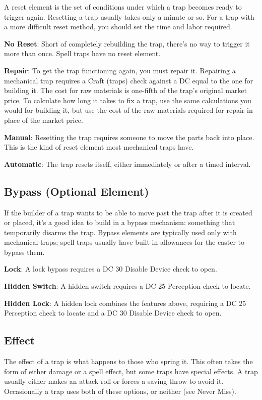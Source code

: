 				
A reset element is the set of conditions under which a trap becomes ready to trigger again. Resetting a trap usually takes only a minute or so. For a trap with a more difficult reset method, you should set the time and labor required.
				
\textbf{No Reset}: Short of completely rebuilding the trap, there's no way to trigger it more than once. Spell traps have no reset element. 
				
\textbf{Repair}: To get the trap functioning again, you must repair it. Repairing a mechanical trap requires a Craft (traps) check against a DC equal to the one for building it. The cost for raw materials is one-fifth of the trap's original market price. To calculate how long it takes to fix a trap, use the same calculations you would for building it, but use the cost of the raw materials required for repair in place of the market price.
				
\textbf{Manual}: Resetting the trap requires someone to move the parts back into place. This is the kind of reset element most mechanical traps have.
				
\textbf{Automatic}: The trap resets itself, either immediately or after a timed interval.
				
\subsection{Bypass (Optional Element)}

				
If the builder of a trap wants to be able to move past the trap after it is created or placed, it's a good idea to build in a bypass mechanism: something that temporarily disarms the trap. Bypass elements are typically used only with mechanical traps; spell traps usually have built-in allowances for the caster to bypass them.
				
\textbf{Lock}: A lock bypass requires a DC 30 Disable Device check to open. 
				
\textbf{Hidden Switch}: A hidden switch requires a DC 25 Perception check to locate.
				
\textbf{Hidden Lock}: A hidden lock combines the features above, requiring a DC 25 Perception check to locate and a DC 30 Disable Device check to open.
				
\subsection{Effect}

				
The effect of a trap is what happens to those who spring it. This often takes the form of either damage or a spell effect, but some traps have special effects. A trap usually either makes an attack roll or forces a saving throw to avoid it. Occasionally a trap uses both of these options, or neither (see Never Miss).
				
